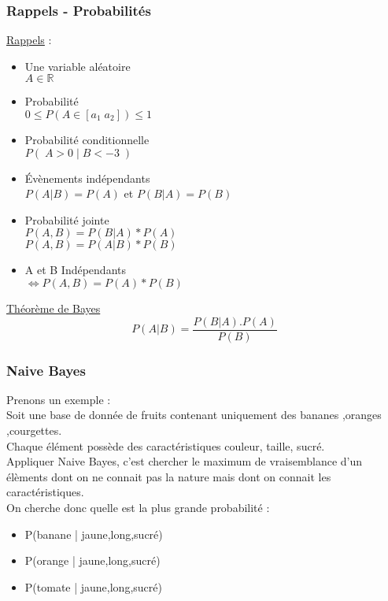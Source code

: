 \begin{frame}
  \frametitle{Rappels - Probabilités}
  \begin{minipage}[c]{0.60\linewidth}
    \underline{Rappels} :
    \begin{itemize}
    \item Une variable aléatoire \\ $A\in\mathbb{R}$
    \item Probabilité \\ $0 \leq P(A\in[a_1\;a_2]) \leq 1$
    \item Probabilité conditionnelle \\ $P(\;A>0\;|\;B<-3\;)$
    \item Évènements indépendants \\ $P(A|B)=P(A)$ et $P(B|A)=P(B)$
    \item Probabilité jointe \\ $P(A,B)=P(B|A)*P(A)$ \\ $P(A,B)=P(A|B)*P(B)$
    \item A et B Indépendants \\ $\iff P(A,B) = P(A)*P(B)$ 
    \end{itemize}
  \end{minipage}\hfill
  \begin{minipage}[c]{0.39\linewidth}
    \begin{center}
      \underline{Théorème de Bayes}
      \[
      \boxed{P(A|B)=\frac{P(B|A).P(A)}{P(B)}}
      \]
    \end{center}
  \end{minipage}\hfill
\end{frame}

\begin{frame}
  \frametitle{Naive Bayes}
  Prenons un exemple : \\
  Soit une base de donnée de fruits contenant uniquement des bananes ,oranges ,courgettes. \\
  Chaque élément possède des caractéristiques couleur, taille, sucré. \\
  Appliquer Naive Bayes, c'est chercher le maximum de vraisemblance d'un élèments dont on ne connait pas la nature mais dont on connait les caractéristiques. \\
  On cherche donc quelle est la plus grande probabilité :
  \begin{itemize}
  \item P(banane | jaune,long,sucré)
  \item P(orange | jaune,long,sucré)
  \item P(tomate | jaune,long,sucré)
  \end{itemize}
\end{frame}

